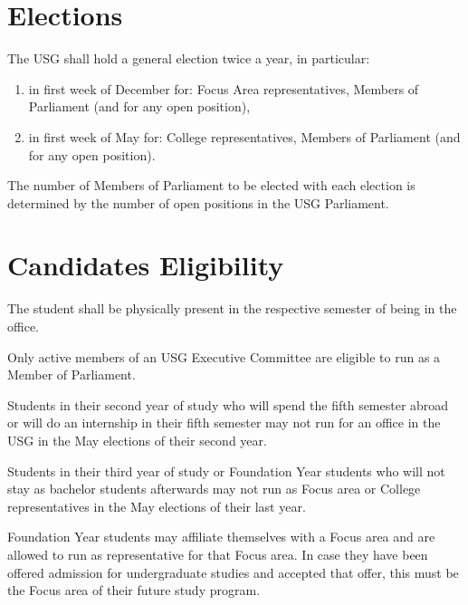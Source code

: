 \label{art:elect}
\section{Elections}
\label{electiontimes}
The USG shall hold a general election twice a year, in particular:
\begin{enumerate}
	\item in first week of December for: Focus Area representatives, Members of Parliament  (and for any open position),
	\item in first week of May for: College representatives, Members of Parliament (and for any open position).
\end{enumerate}
The number of Members of Parliament to be elected with each election is determined by the number of open positions in the USG Parliament.

\section{Candidates Eligibility}\label{eligible}
	The student shall be physically present in the respective semester of being in the office.
	\begin{parenum}
		\item Only active members of an USG Executive Committee are eligible to run as a Member of Parliament. 
		\item Students in their second year of study who will spend the fifth semester abroad or will do an internship in their fifth semester may not run for an office in the USG in the May elections of their second year.	
		\item Students in their third year of study or Foundation Year students who will not stay as bachelor students afterwards may not run as Focus area or College representatives in the May elections of their last year.
		\item Foundation Year students may affiliate themselves with a Focus area and are allowed to run as representative for that Focus area. In case they have been offered admission for undergraduate studies and accepted that offer, this must be the Focus area of their future study program.
	\end{parenum}



